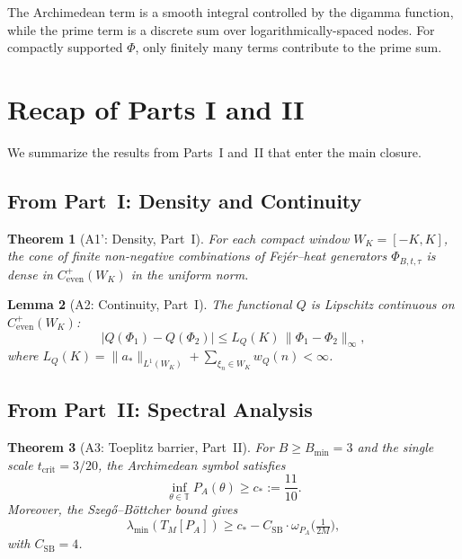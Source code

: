 \documentclass[11pt,a4paper]{article}
\newtheorem{theorem}{Theorem}[section]
\newtheorem{lemma}[theorem]{Lemma}
\theoremstyle{definition}
\theoremstyle{remark}
\newcommand{\T}{\mathbb{T}}
\begin{document}
The Archimedean term is a smooth integral controlled by the digamma function, while the prime term is a discrete sum over logarithmically-spaced nodes. For compactly supported $\Phi$, only finitely many terms contribute to the prime sum.

\section{Recap of Parts I and II}
\label{sec:recap}

We summarize the results from Parts~I and~II that enter the main closure.

\subsection{From Part~I: Density and Continuity}

\begin{theorem}[A1': Density, Part~I]\label{thm:A1-recap}
For each compact window $W_K = [-K, K]$, the cone of finite non-negative combinations of Fej\'er--heat generators $\Phi_{B,t,\tau}$ is dense in $C^+_{\mathrm{even}}(W_K)$ in the uniform norm.
\end{theorem}

\begin{lemma}[A2: Continuity, Part~I]\label{lem:A2-recap}
The functional $Q$ is Lipschitz continuous on $C^+_{\mathrm{even}}(W_K)$:
\begin{equation}\label{eq:A2-Lip}
  |Q(\Phi_1) - Q(\Phi_2)| \leq L_Q(K)\, \|\Phi_1 - \Phi_2\|_\infty,
\end{equation}
where $L_Q(K) = \|a_*\|_{L^1(W_K)} + \sum_{\xi_n \in W_K} w_Q(n) < \infty$.
\end{lemma}

\subsection{From Part~II: Spectral Analysis}

\begin{theorem}[A3: Toeplitz barrier, Part~II]\label{thm:A3-recap}
For $B \geq B_{\min} = 3$ and the single scale $t_{\mathrm{crit}} = 3/20$, the Archimedean symbol satisfies
\begin{equation}\label{eq:floor}
  \inf_{\theta \in \T} P_A(\theta) \geq c_* := \frac{11}{10}.
\end{equation}
Moreover, the Szeg\H{o}--B\"ottcher bound gives
\begin{equation}\label{eq:SB}
  \lambda_{\min}(T_M[P_A]) \geq c_* - C_{\mathrm{SB}} \cdot \omega_{P_A}\bigl(\tfrac{1}{2M}\bigr),
\end{equation}
with $C_{\mathrm{SB}} = 4$.
\end{theorem}
\end{document}
